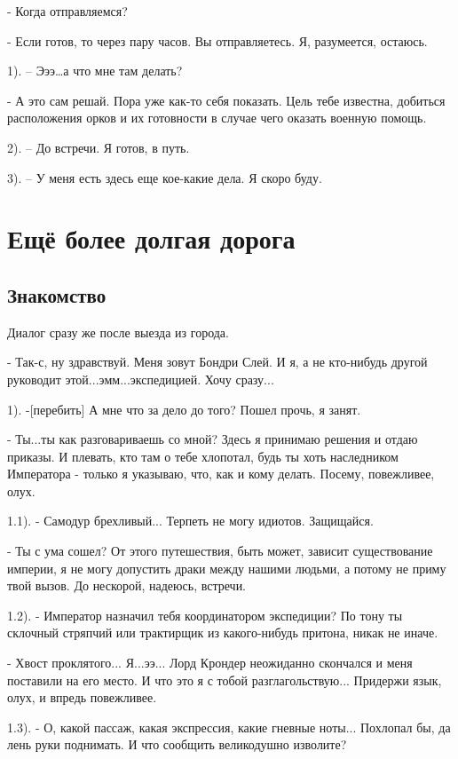 \documentclass[12pt,a4paper]{book}
\begin{document}
- Когда отправляемся?

- Если готов, то через пару часов. Вы отправляетесь. Я, разумеется, остаюсь.

1). – Эээ…а что мне там делать?

- А это сам решай. Пора уже как-то себя показать. Цель тебе известна, добиться расположения орков и их готовности в случае чего оказать военную помощь.

2). – До встречи. Я готов, в путь.

3). – У меня есть здесь еще кое-какие дела. Я скоро буду.

\chapter{Ещё более долгая дорога}

\section{Знакомство}

Диалог сразу же после выезда из города.

- Так-с, ну здравствуй. Меня зовут Бондри Слей. И я, а не кто-нибудь другой руководит этой...эмм...экспедицией. Хочу сразу...

1). -[перебить] А мне что за дело до того? Пошел прочь, я занят.

- Ты...ты как разговариваешь со мной? Здесь я принимаю решения и отдаю приказы. И плевать, кто там о тебе хлопотал, будь ты хоть наследником Императора - только я указываю, что, как и кому делать. Посему, повежливее, олух.

1.1). - Самодур брехливый... Терпеть не могу идиотов. Защищайся.

- Ты с ума сошел? От этого путешествия, быть может, зависит существование империи, я не могу допустить драки между нашими людьми, а потому не приму твой вызов. До нескорой, надеюсь, встречи.

1.2). - Император назначил тебя координатором экспедиции? По тону ты склочный стряпчий или трактирщик из какого-нибудь притона, никак не иначе.

- Хвост проклятого... Я...ээ... Лорд Крондер неожиданно скончался и меня поставили на его место. И что это я с тобой разглагольствую... Придержи язык, олух, и впредь повежливее.

1.3). - О, какой пассаж, какая экспрессия, какие гневные ноты... Похлопал бы, да лень руки поднимать. И что сообщить великодушно изволите?
\end{document}
